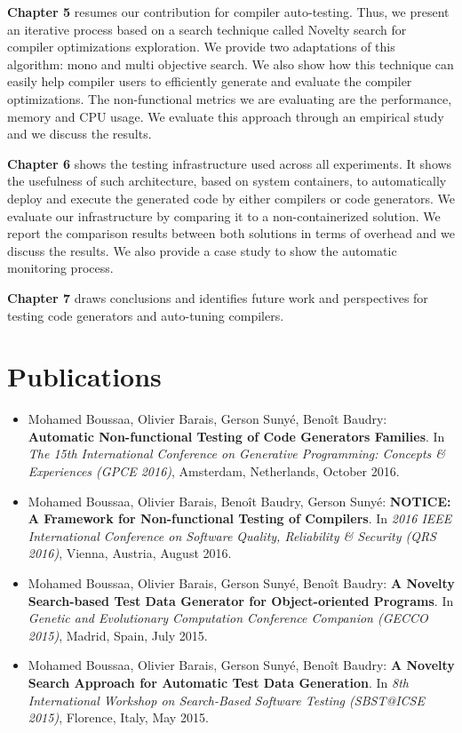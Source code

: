 \textbf{Chapter 5} resumes our contribution for compiler auto-testing. Thus, we present an iterative process based on a search technique called Novelty search for compiler optimizations exploration. We provide two adaptations of this algorithm: mono and multi objective search. We also show how this technique can easily help compiler users to efficiently generate and evaluate the compiler optimizations. The non-functional metrics we are evaluating are the performance, memory and CPU usage. We evaluate this approach through an empirical study and we discuss the results.

\textbf{Chapter 6} shows the testing infrastructure used across all experiments. It shows the usefulness of such architecture, based on system containers, to automatically deploy and execute the generated code by either compilers or code generators. 
We evaluate our infrastructure by comparing it to a non-containerized solution. We report the comparison results between both solutions in terms of overhead and we discuss the results. We also provide a case study to show the automatic monitoring process. 

\textbf{Chapter 7} draws conclusions and identifies future work and perspectives for testing code generators and auto-tuning compilers.

\section{Publications}

\begin{itemize}
	
	\item Mohamed Boussaa, Olivier Barais, Gerson Suny\'e, Beno\^it Baudry:
	\textbf{Automatic Non-functional Testing of Code Generators Families}. In
	\textit{The 15th International Conference on Generative Programming: Concepts \& Experiences (GPCE 2016)},
	Amsterdam, Netherlands, October 2016.

	\item Mohamed Boussaa, Olivier Barais, Beno\^it Baudry, Gerson Suny\'e:
	\textbf{NOTICE: A Framework for Non-functional Testing of Compilers}. In 
	\textit{2016 IEEE International Conference on Software Quality, Reliability \& Security (QRS 2016)}, Vienna, Austria, August 2016.
	
	\item Mohamed Boussaa, Olivier Barais, Gerson Suny\'e, Beno\^it Baudry:
	\textbf{A Novelty Search-based Test Data Generator for Object-oriented Programs}. In 
	\textit{Genetic and Evolutionary Computation Conference Companion (GECCO 2015)}, 
	Madrid, Spain, July 2015.
	
	\item Mohamed Boussaa, Olivier Barais, Gerson Suny\'e, Beno\^it Baudry:
	\textbf{A Novelty Search Approach for Automatic Test Data Generation}. In
	\textit{8th International Workshop on Search-Based Software Testing (SBST@ICSE 2015)}, 
	Florence, Italy, May 2015.

	
	
\end{itemize}



